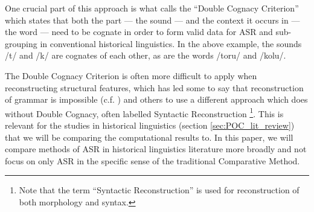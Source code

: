 \documentclass[12pt,letterpaper]{article}
\begin{document}
One crucial part of this approach is what \citet{walkden_2013} calls the ``Double Cognacy Criterion'' which states that both the part --- the sound --- and the context it occurs in --- the word --- need to be cognate in order to form valid data for ASR and sub-grouping in conventional historical linguistics. In the above example, the sounds /t/ and /k/ are cognates of each other, as are the words /toru/ and /kolu/.

The Double Cognacy Criterion is often more difficult to apply when reconstructing structural features, which has led some to say that reconstruction of grammar is impossible (c.f. \citet{lightfoot_2002b}) and others to use a different approach which does without Double Cognacy, often labelled Syntactic Reconstruction \citep[17]{clark1973aspects}\footnote{Note that the term ``Syntactic Reconstruction'' is used for reconstruction of both morphology and syntax.}. This is relevant for the studies in historical linguistics (section \ref{sec:POC_lit_review}) that we will be comparing the computational results to. In this paper, we will compare methods of ASR in historical linguistics literature more broadly and not focus on only ASR in the specific sense of the traditional Comparative Method.



\end{document}
